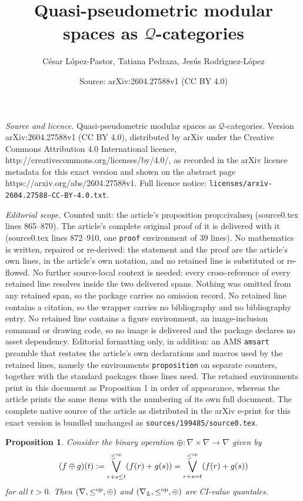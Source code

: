 \documentclass[10pt,a4paper]{amsart}
\title{Quasi-pseudometric modular spaces as $\mathscr{Q}$-categories}
\author{C\'esar L\'opez-Pastor, Tatiana Pedraza, Jes\'us Rodr\'{\i}guez-L\'opez}
\date{Source: arXiv:2604.27588v1 (CC BY 4.0)}
\newtheorem{proposition}{Proposition}
\begin{document}
\maketitle

\noindent\emph{Source and licence.} Quasi-pseudometric modular spaces as $\mathscr{Q}$-categories. Version arXiv:2604.27588v1 (CC BY 4.0), distributed by arXiv under the Creative Commons Attribution 4.0 International licence, http://creativecommons.org/licenses/by/4.0/, as recorded in the arXiv licence metadata for this exact version and shown on the abstract page https://arxiv.org/abs/2604.27588v1. Full licence notice: \texttt{licenses/arxiv-2604.27588-CC-BY-4.0.txt}.\par\smallskip

\noindent\textit{Editorial scope.} Counted unit: the article's proposition prop:civalueq (source0.tex lines 865--870). The article's complete original proof of it is delivered with it (source0.tex lines 872--910, one \texttt{proof} environment of 39 lines). No mathematics is written, repaired or re-derived: the statement and the proof are the article's own lines, in the article's own notation, and no retained line is substituted or re-flowed.  No further source-local context is needed: every cross-reference of every retained line resolves inside the two delivered spans.  Nothing was omitted from any retained span, so the package carries no omission record.  No retained line contains a citation, so the wrapper carries no bibliography and no bibliography entry.  No retained line contains a figure environment, an image-inclusion command or drawing code, so no image is delivered and the package declares no asset dependency.  Editorial formatting only, in addition: an AMS \texttt{amsart} preamble that restates the article's own declarations and macros used by the retained lines, namely the environments \texttt{proposition} on separate counters, together with the standard packages those lines need.  The retained environments print in this document as Proposition 1 in order of appearance, whereas the article prints the same items with the numbering of its own full document.  The complete native source of the article as distributed in the arXiv e-print for this exact version is bundled unchanged as \texttt{sources/199485/source0.tex}.
	\begin{proposition}\label{prop:civalueq}
		Consider the binary operation $\oplus:\nabla\times\nabla\to\nabla$ given by
		\[(f\oplus g)(t):=\bigvee_{r+s\leq t}^{\leq^\text{\normalfont op}}(f(r)+g(s))=\bigvee_{r+s=t}^{\leq^\text{\normalfont op}}(f(r)+g(s))\]
		for all $t>0.$ 
		Then $(\nabla,\leq^\text{\normalfont op},\oplus)$ and $(\nabla_L,\leq^\text{\normalfont op},\oplus)$ are  CI-value quantales.
	\end{proposition}
\end{document}
